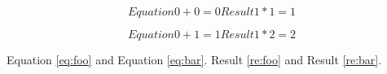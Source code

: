 \documentclass{report}
\begin{document}
\begin{subequations}
	Equation
	\begin{equation} \label{eq:foo}
		0+0=0
	\end{equation}

	Result
	\begin{equation} \label{re:foo}
		1*1=1
	\end{equation}
\end{subequations}

\begin{subequations}
	Equation
	\begin{equation} \label{eq:bar}
		0+1=1
	\end{equation}

	Result
	\begin{equation} \label{re:bar}
		1*2=2
	\end{equation}
\end{subequations}

Equation \ref{eq:foo} and Equation \ref{eq:bar}.
Result \ref{re:foo} and Result \ref{re:bar}.
\end{document}
